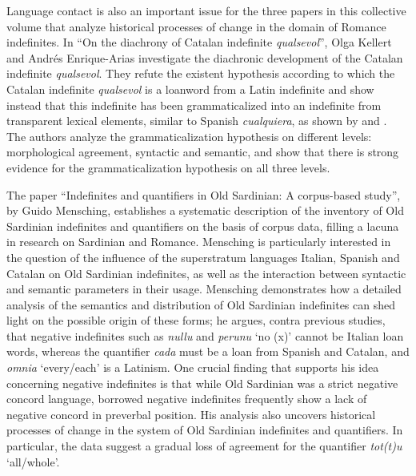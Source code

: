 \documentclass[output=paper,colorlinks,citecolor=brown]{langscibook}
\begin{document}
Language contact is also an important issue for the three papers in this collective volume that analyze historical processes of change in the domain of Romance indefinites. In “On the diachrony of Catalan indefinite \textit{qualsevol}”, Olga Kellert and Andrés Enrique-Arias investigate the diachronic development of the Catalan indefinite \textit{qualsevol}. They refute the existent hypothesis according to which the Catalan indefinite \textit{qualsevol} is a loanword from a Latin indefinite and show instead that this indefinite has been grammaticalized into an indefinite from transparent lexical elements, similar to Spanish \textit{cualquiera}, as shown by \citet{CompanyCompanyPozasLoyo2009} and \citet{Kellert2021a, Kellert2021b}. The authors analyze the grammaticalization hypothesis on different levels: morphological agreement, syntactic and semantic, and show that there is strong evidence for the grammaticalization hypothesis on all three levels.     

The paper “Indefinites and quantifiers in Old Sardinian: A corpus-based study”, by Guido Mensching, establishes a systematic description of the inventory of Old Sardinian indefinites and quantifiers on the basis of corpus data, filling a lacuna in research on Sardinian and Romance. Mensching is particularly interested in the question of the influence of the superstratum languages Italian, Spanish and Catalan on Old Sardinian indefinites, as well as the interaction between syntactic and semantic parameters in their usage. Mensching demonstrates how a detailed analysis of the semantics and distribution of Old Sardinian indefinites can shed light on the possible origin of these forms; he argues, contra previous studies, that negative indefinites such as \textit{nullu} and \textit{perunu} ‘no (x)’ cannot be Italian loan words, whereas the quantifier \textit{cada} must be a loan from Spanish and Catalan, and \textit{omnia} ‘every/each’ is a Latinism. One crucial finding that supports his idea concerning negative indefinites is that while Old Sardinian was a strict negative concord language, borrowed negative indefinites frequently show a lack of negative concord in preverbal position. His analysis also uncovers historical processes of change in the system of Old Sardinian indefinites and quantifiers. In particular, the data suggest a gradual loss of agreement for the quantifier \textit{tot(t)u} ‘all/whole’. 
\end{document}
